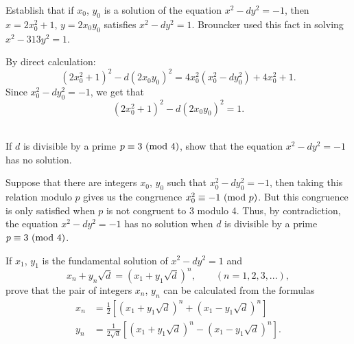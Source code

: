 \begin{exercise}
    Establish that if $x_0$, $y_0$ is a solution of the equation $x^2 - dy^2 = -1$, then $x = 2x_0^2 + 1$, $y = 2x_0y_0$ satisfies $x^2 - dy^2 = 1$. Brouncker used this fact in solving $x^2 - 313y^2 = 1$. \\
\end{exercise}

\begin{solution}
    By direct calculation:
    $$(2x_0^2 + 1)^2 - d(2x_0y_0)^2 = 4x_0^2(x_0^2 - dy_0^2) + 4x_0^2 + 1.$$
    Since $x_0^2 - dy_0^2 = -1$, we get that
    $$(2x_0^2 + 1)^2 - d(2x_0y_0)^2 = 1.$$\\
\end{solution}

\begin{exercise}
    If $d$ is divisible by a prime $p \equiv 3 \ (\mathrm{mod}\ 4)$, show that the equation $x^2 - dy^2 = -1$ has no solution. \\
\end{exercise}

\begin{solution}
    Suppose that there are integers $x_0$, $y_0$ such that $x_0^2 - dy_0^2 = -1$, then taking this relation modulo $p$ gives us the congruence $x_0^2 \equiv -1 \ (\mathrm{mod}\ p)$. But this congruence is only satisfied when $p$ is not congruent to 3 modulo 4. Thus, by contradiction, the equation $x^2 - dy^2 = -1$ has no solution when $d$ is divisible by a prime $p \equiv 3 \ (\mathrm{mod}\ 4)$. \\
\end{solution}

\begin{exercise}
    If $x_1$, $y_1$ is the fundamental solution of $x^2 - dy^2 = 1$ and
    $$x_n + y_n\sqrt{d} = (x_1 + y_1\sqrt{d})^n, \qquad (n=1,2,3,...),$$
    prove that the pair of integers $x_n$, $y_n$ can be calculated from the formulas
    \begin{align*}
        x_n &= \frac{1}{2}\left[(x_1 + y_1\sqrt{d})^n + (x_1 - y_1\sqrt{d})^n\right] \\
        y_n &= \frac{1}{2\sqrt{d}}\left[(x_1 + y_1\sqrt{d})^n - (x_1 - y_1\sqrt{d})^n\right].\\
    \end{align*}
\end{exercise}

